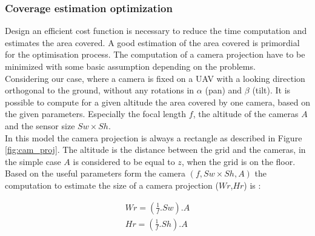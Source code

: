 \subsubsection{Coverage estimation optimization} \label{sec:coverageEstimation}
Design an efficient cost function is necessary to reduce the time computation and estimates the area covered. A good estimation of the area covered is primordial for the optimisation process. 
  The computation of a camera projection have to be minimized with some basic assumption depending on the problems.\\
Considering our case, where a camera is fixed on a UAV with a looking direction orthogonal to the ground, without any rotations in $\alpha$ (pan) and $\beta$ (tilt). It is possible to compute for a given altitude the area covered by one camera, based on the given parameters. Especially the focal length $f$, the altitude of the cameras $A$ and the sensor size $Sw\times Sh$. \\
In this model the camera projection is always a rectangle as described in Figure \ref{fig:cam_proj}. 
The altitude is the distance between the grid and the cameras, in the simple case $A$ is considered to be equal to $z$, when the grid is on the floor.  \\
Based on the useful parameters form the camera $(f ,Sw\times Sh ,A)$ the computation to estimate the size of a camera projection ($Wr$,$Hr$) is :

%

	
	
	\begin{equation} \label{eq:WrHr1}
	\begin{split}
			Wr=(\frac{1}{f} . Sw).A\\
			Hr=(\frac{1}{f} . Sh).A
     \end{split} 
	\end{equation}
	
